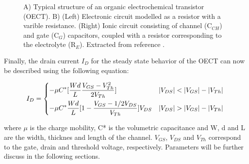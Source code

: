 \begin{figure}[h]
	\centering
	\hspace{2em}
	\caption[Typical OECT structure and circuit model]{A) Typical structure of an organic electrochemical transistor (OECT). B) (Left) Electronic circuit modelled as a resistor with a varible resistance. (Right) Ionic circuit consisting of channel (C$_{CH}$) and gate (C$_{G}$) capacitors, coupled with a resistor corresponding to the electrolyte (R$_{E}$). Extracted from reference \cite{rivnayOrganicElectrochemicalTransistors2018}.}
	\label{fig:bernard}
\end{figure}

Finally, the drain current $I_{D}$ for the steady state behavior of the OECT can now be described using the following equation:

\begin{equation}\label{eq:id}
	I_{D} = \begin{dcases*}
    -\mu C^{*} [\frac{Wd}{L}\frac{V_{GS}-V_{Th}^{2}}{2V_{Th}}] & \text{$|V_{DS}| < |V_{GS}|-|V_{Th}|$} \\
    -\mu C^{*} \frac{Wd}{L} [1 - \frac{V_{GS}-1/2 V_{DS}}{V_{Th}}] V_{DS} & \text{$|V_{DS}| > |V_{GS}|-|V_{Th}|$}
    \end{dcases*}
\end{equation}

where $\mu$ is the charge mobility, C* is the volumetric capacitance and W, d and L are the width, thicknes and length of the channel. $V_{GS}$, $V_{DS}$ and $V_{Th}$ correspond to the gate, drain and threshold voltage, respectively. Parameters will be further discuss in the following sections.  

